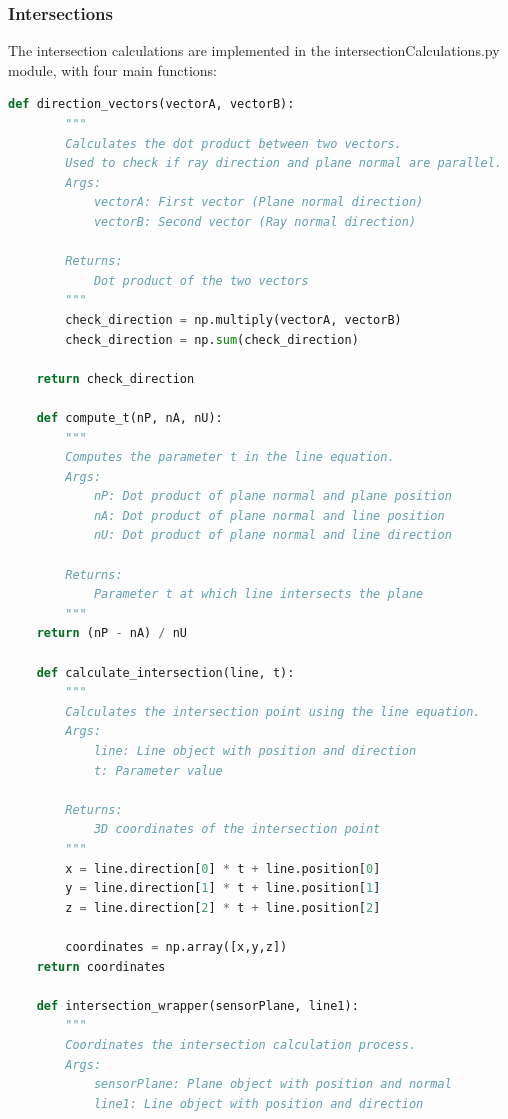 \subsubsection{Intersections}
The intersection calculations are implemented in the intersectionCalculations.py module, with four main functions:
\begin{lstlisting}[style=pythonstyle, caption=Ray-Plane Intersection Algorithm, label=lst:Ray-Plane Intersection Algorithm, language=Python ]
    def direction_vectors(vectorA, vectorB):
        """
        Calculates the dot product between two vectors.
        Used to check if ray direction and plane normal are parallel.
        Args:
            vectorA: First vector (Plane normal direction)
            vectorB: Second vector (Ray normal direction)
            
        Returns:
            Dot product of the two vectors
        """
        check_direction = np.multiply(vectorA, vectorB)
        check_direction = np.sum(check_direction)

    return check_direction

    def compute_t(nP, nA, nU):
        """
        Computes the parameter t in the line equation.
        Args:
            nP: Dot product of plane normal and plane position
            nA: Dot product of plane normal and line position
            nU: Dot product of plane normal and line direction
            
        Returns:
            Parameter t at which line intersects the plane
        """
    return (nP - nA) / nU

    def calculate_intersection(line, t):
        """
        Calculates the intersection point using the line equation.
        Args:
            line: Line object with position and direction
            t: Parameter value
            
        Returns:
            3D coordinates of the intersection point
        """
        x = line.direction[0] * t + line.position[0]
        y = line.direction[1] * t + line.position[1]
        z = line.direction[2] * t + line.position[2]

        coordinates = np.array([x,y,z])
    return coordinates

    def intersection_wrapper(sensorPlane, line1):
        """
        Coordinates the intersection calculation process.
        Args:
            sensorPlane: Plane object with position and normal
            line1: Line object with position and direction
            

\end{lstlisting}
